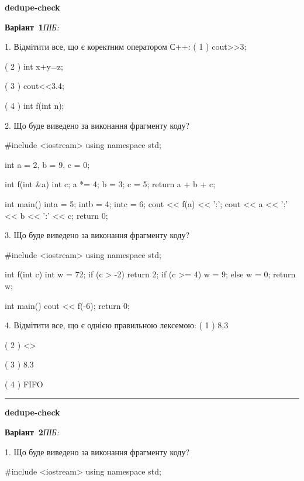 \documentclass[11pt]{article}
\begin{document}
{\large\textbf{dedupe-check}}

\textbf{Варіант \No\,1}\hfill \textit{ПІБ:}\,\underline{\hspace{60mm}}
\vspace{4mm}

1. Відмітити все, що є коректним оператором С++:
( 1 ) cout>>3;

( 2 ) int x+y=z;

( 3 ) cout<<3.4;

( 4 ) int f(int n);

2. Що буде виведено за виконання фрагменту коду?

#include <iostream>
using namespace std;

int a = 2, b = 9, c = 0;

int f(int &a){
int c;    a *= 4;
    b = 3;
    c = 5;
    return a + b + c;
}

int main(){
    inta = 5;
    intb = 4;
    intc = 6;
    cout << f(a) << ':';
    cout << a << ':' << b << ':' << c;
    return 0; 
}

3. Що буде виведено за виконання фрагменту коду?

#include <iostream>
using namespace std;

int f(int c){
    int w = 72;
    if (c > -2) 
        return 2;
    if (c >= 4)
         w = 9;
    else
         w = 0;
    return w;
}

int main(){
    cout << f(-6);
    return 0;
}


4. Відмітити все, що є однією правильною лексемою:
( 1 ) 8,3

( 2 ) <>

( 3 ) 8.3

( 4 ) FIFO





\vspace{10mm}
\noindent\rule{\textwidth}{0.3pt}
\vspace{8mm}
{\large\textbf{dedupe-check}}

\textbf{Варіант \No\,2}\hfill \textit{ПІБ:}\,\underline{\hspace{60mm}}
\vspace{4mm}

1. Що буде виведено за виконання фрагменту коду?

#include <iostream>
using namespace std;
\end{document}
